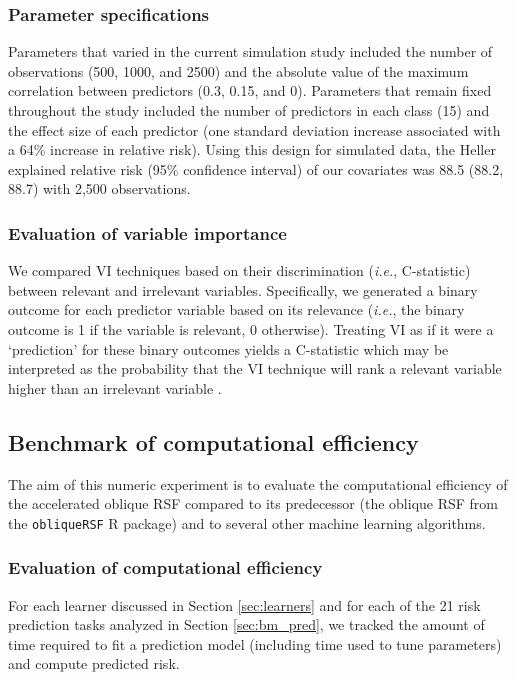 \documentclass[12pt]{article}\usepackage[]{graphicx}\usepackage[]{xcolor}
\newcommand{\ie}{\textit{i.e.}}
\newcommand{\secref}[1]{Section \ref{#1}}
\begin{document}
\subsubsection{Parameter specifications}




Parameters that varied in the current simulation study included the number of observations (500, 1000, and 2500) and the absolute value of the maximum correlation between predictors (0.3, 0.15, and 0). Parameters that remain fixed throughout the study included the number of predictors in each class (15) and the effect size of each predictor (one standard deviation increase associated with a 64\% increase in relative risk). Using this design for simulated data, the Heller explained relative risk (95\% confidence interval) of our covariates was 88.5 (88.2, 88.7) \citep{heller2012measure} with 2,500 observations.

\subsubsection{Evaluation of variable importance}

We compared VI techniques based on their discrimination (\ie, C-statistic) between relevant and irrelevant variables. Specifically, we generated a binary outcome for each predictor variable based on its relevance (\ie, the binary outcome is 1 if the variable is relevant, 0 otherwise). Treating VI as if it were a ‘prediction’ for these binary outcomes yields a C-statistic which may be interpreted as the probability that the VI technique will rank a relevant variable higher than an irrelevant variable \citep{harrell1982evaluating}.

\subsection{Benchmark of computational efficiency} \label{sec:bm_compute}

The aim of this numeric experiment is to evaluate the computational efficiency of the accelerated oblique RSF compared to its predecessor (the oblique RSF from the \texttt{obliqueRSF} R package) and to several other machine learning algorithms.

\subsubsection{Evaluation of computational efficiency}

For each learner discussed in \secref{sec:learners} and for each of the 21 risk prediction tasks analyzed in \secref{sec:bm_pred}, we tracked the amount of time required to fit a prediction model (including time used to tune parameters) and compute predicted risk.
\end{document}

